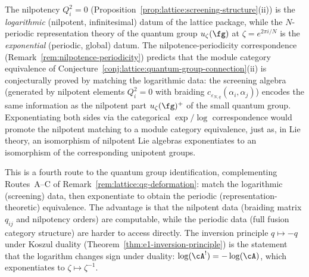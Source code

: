 \begin{remark}
\label{rem:screening-nilpotence-periodicity}
The nilpotency $Q_i^2 = 0$
(Proposition~\ref{prop:lattice:screening-structure}(ii)) is the
\emph{logarithmic} (nilpotent, infinitesimal) datum of the lattice
package, while the $N$-periodic representation theory of the quantum
group $u_\zeta(\fg)$ at $\zeta = e^{2\pi i/N}$ is the
\emph{exponential} (periodic, global) datum. The
nilpotence-periodicity correspondence
(Remark~\ref{rem:nilpotence-periodicity}) predicts that the module
category equivalence of
Conjecture~\ref{conj:lattice:quantum-group-connection}(ii)
is conjecturally proved by matching the logarithmic data: the screening
algebra (generated by nilpotent elements $Q_i^2 = 0$ with braiding
$c_{\varepsilon_{N,q}}(\alpha_i,\alpha_j)$) encodes the same
information as the nilpotent part $u_\zeta(\fg)^+$ of the small quantum
group. Exponentiating both sides via the categorical $\exp/\log$
correspondence would promote the nilpotent matching to a module
category equivalence, just as, in Lie theory, an isomorphism of
nilpotent Lie algebras exponentiates to an isomorphism of the
corresponding unipotent groups.

This is a fourth route to the quantum group identification,
complementing Routes~A--C of
Remark~\ref{rem:lattice:qg-deformation}: match the logarithmic
(screening) data, then exponentiate to obtain the periodic
(representation-theoretic) equivalence. The advantage is that
the nilpotent data (braiding matrix $q_{ij}$ and nilpotency orders)
are computable, while the periodic data (full fusion category
structure) are harder to access directly. The inversion principle
$q \mapsto -q$ under Koszul duality
(Theorem~\ref{thm:e1-inversion-principle}) is the statement that
the logarithm changes sign under duality: $\log(\cA^!) = -\log(\cA)$,
which exponentiates to $\zeta \mapsto \zeta^{-1}$.
\end{remark}

